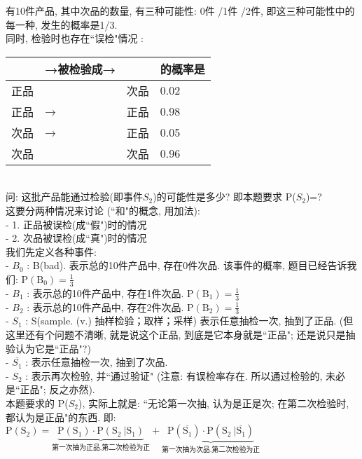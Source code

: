 \documentclass[UTF8]{ctexart}
\begin{document}
	
	\begin{myEnvSample}
		有10件产品, 其中次品的数量, 有三种可能性: 0件 /1件 /2件, 即这三种可能性中的每一种, 发生的概率是1/3.  \\
		同时, 检验时也存在``误检"情况 : \\
		\begin{tabular}{|l|l|l|l|}
			\hline
			& →被检验成→ &    & 的概率是   \\
			\hline
			正品 &        & 次品 & 0.02    \\
			\hline
			正品 &    →    & 正品 & 0.98    \\
			\hline
			次品 &   →     & 正品 & 0.05    \\
			\hline
			次品 &        & 次品 & 0.96  \\
			\hline
		\end{tabular}\\
		
		问: 这批产品能通过检验(即事件$S_2$)的可能性是多少? 即本题要求 P($S_2$)=? \\
		这要分两种情况来讨论 (``和"的概念, 用加法): \\
		- 1. 正品被误检(成``假")时的情况 \\
		- 2. 次品被误检(成``真")时的情况 \\
		
		我们先定义各种事件: \\
		- $B_0$ : B(bad). 表示总的10件产品中, 存在0件次品. 该事件的概率, 题目已经告诉我们: $\text{P}\left( \text{B}_0 \right) =\frac{1}{3}$
		\\
		- $B_1$ : 表示总的10件产品中, 存在1件次品. $\text{P}\left( \text{B}_1 \right) =\frac{1}{3}$
		\\
		- $B_2$ : 表示总的10件产品中, 存在2件次品. $\text{P}\left( \text{B}_2 \right) =\frac{1}{3}$
		\\
		- $S_1$ : S(sample. (v.) 抽样检验；取样；采样) 表示任意抽检一次, 抽到了正品. (但这里还有个问题不清晰, 就是说这个正品, 到底是它本身就是``正品"; 还是说只是抽验认为它是``正品"?) \\
		- $\overline{S_1}$ : 表示任意抽检一次, 抽到了次品. \\
		- $S_2$ : 表示再次检验, 并``通过验证" (注意: 有误检率存在. 所以通过检验的, 未必是``正品"; 反之亦然). \\
		
		
		本题要求的 P($S_2$), 实际上就是: ``无论第一次抽, 认为是正是次; 在第二次检验时, 都认为是正品"的东西. 即: $
		\text{P}\left( \text{S}_2 \right) =\underset{\text{第一次抽为正品,第二次检验为正}}{\underbrace{\text{P}\left( \text{S}_1 \right) \cdot \text{P}\left( \text{S}_2\ |\text{S}_1 \right) }}+\underset{\text{第一次抽为次品,第二次检验为正}}{\underbrace{\text{P}\left( \overline{\text{S}_1} \right) \cdot \text{P}\left( \text{S}_2\ |\overline{\text{S}_1} \right) }}
		$ \\
		

\end{myEnvSample}
\end{document}
